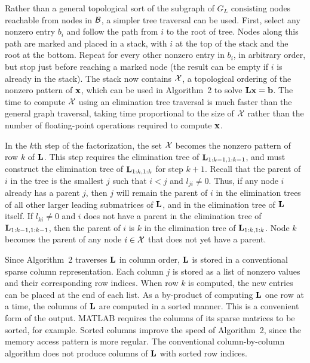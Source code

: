\documentclass[12pt]{article}
\newcommand{\m}[1]{{\bf{#1}}}       %
\begin{document}
Rather than a general topological sort of the subgraph of $G_L$ consisting
nodes reachable from nodes in ${\cal B}$, a simpler
tree traversal can be used.  First, select any nonzero entry $b_i$
and follow the path from $i$ to the root of tree.
Nodes along this path are marked and placed in a stack,
with $i$ at the top of the
stack and the root at the bottom.
Repeat for every other nonzero entry in $b_i$, in arbitrary order, but stop
just before reaching a marked node (the result can be empty if $i$ is already
in the stack).  The stack now contains ${\cal X}$, a topological ordering of
the nonzero pattern of $\m{x}$, which can be used in Algorithm~2 to solve
$\m{Lx}=\m{b}$.  The time to compute ${\cal X}$
using an elimination tree traversal is much faster than the general graph
traversal, taking time proportional to the size of ${\cal X}$ rather than the
number of floating-point operations required to compute $\m{x}$.

In the $k$th step of the factorization, the set ${\cal X}$ becomes the
nonzero pattern of row $k$ of $\m{L}$.  This step requires the elimination
tree of $\m{L}_{1:k-1,1:k-1}$, and must construct the elimination tree of
$\m{L}_{1:k,1:k}$ for step $k+1$.  Recall that the parent of $i$ in the
tree is the smallest $j$ such that $i < j$ and $l_{ji} \ne 0$.
Thus, if any node $i$ already has a parent $j$, then $j$ will remain the
parent of $i$ in the elimination trees of all other larger leading submatrices
of $\m{L}$, and in the elimination tree of $\m{L}$ itself.
If $l_{ki} \ne 0$ and $i$ does not have a parent in the elimination tree of
$\m{L}_{1:k-1,1:k-1}$, then the parent of $i$ is $k$
in the elimination tree of $\m{L}_{1:k,1:k}$.
Node $k$ becomes the parent of any node $i \in {\cal X}$ that does not yet
have a parent.

Since Algorithm~2 traverses $\m{L}$ in column order, $\m{L}$ is stored in a
conventional sparse column representation.  Each column $j$ is stored as a list
of nonzero values and their corresponding row indices.  When row $k$ is
computed, the new entries can be placed at the end of each list.  As
a by-product of computing $\m{L}$ one row at a time,
the columns of $\m{L}$ are computed in a sorted manner.  This is a convenient
form of the output.
MATLAB requires the columns of its sparse matrices to be sorted, for example.
Sorted columns improve the speed of Algorithm~2, since the memory access
pattern is more regular.  The conventional column-by-column algorithm
\cite{GeorgeLiu79,GeorgeLiu} does not produce columns of $\m{L}$ with
sorted row indices.
\end{document}
